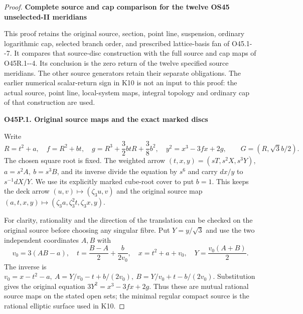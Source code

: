 \begin{proof}
\par

\medskip\noindent\textbf{Complete source and cap comparison for the twelve OS45 unselected-II meridians}

\par\nobreak

This proof retains the original source, section, point line, suspension,
ordinary logarithmic cap, selected branch order, and prescribed lattice-basis
fan of O45.1-\/-7. It compares that source-disc construction with the
full source and cap maps of O45R.1-\/-4. Its conclusion is the zero return of the
twelve specified source meridians. The other source generators retain their
separate obligations. The earlier numerical scalar-return sign in K10 is
not an input to this proof: the actual source, point line, local-system
maps, integral topology and ordinary cap of that construction are used.

\par

\medskip\noindent\textbf{O45P.1. Original source maps and the exact marked discs}

\par\nobreak

Write
\[
 R=t^2+a,\quad f=R^2+bt,\quad
 g=R^3+\frac32btR+\frac38b^2,\quad
 y^2=x^3-3fx+2g,\qquad G=(R,\sqrt3b/2).
 \tag{O45P.1}
\]
The chosen square root is fixed. The weighted arrow
\((t,x,y)=(sT,s^2X,s^3Y)\), \(a=s^2A,\ b=s^3B\), and its inverse
divide the equation by \(s^6\) and carry \(dx/y\) to \(s^{-1}dX/Y\).
We use its explicitly marked cube-root cover to put \(b=1\).
This keeps the deck arrow
\((u,v)\mapsto(\zeta_3u,v)\) and the original source map
\((a,t,x,y)\mapsto(\zeta_3a,\zeta_3^2t,\zeta_3x,y)\).

For clarity, rationality and the direction of the translation can be
checked on the original source before choosing any singular fibre.
Put \(Y=y/\sqrt3\) and use the two independent coordinates \(A,B\) with
\[
 v_0=3(AB-a),\quad
 t=\frac{B-A}{2}+\frac{b}{2v_0},\quad
 x=t^2+a+v_0,\quad Y=\frac{v_0(A+B)}2.
 \tag{O45P.2}
\]
The inverse is
\(v_0=x-t^2-a,\ A=Y/v_0-t+b/(2v_0),\
B=Y/v_0+t-b/(2v_0)\).
Substitution gives the original equation \(3Y^2=x^3-3fx+2g\).
Thus these are mutual rational source maps on the stated open sets;
the minimal regular compact source is the rational elliptic surface
used in K10.


\end{proof}
